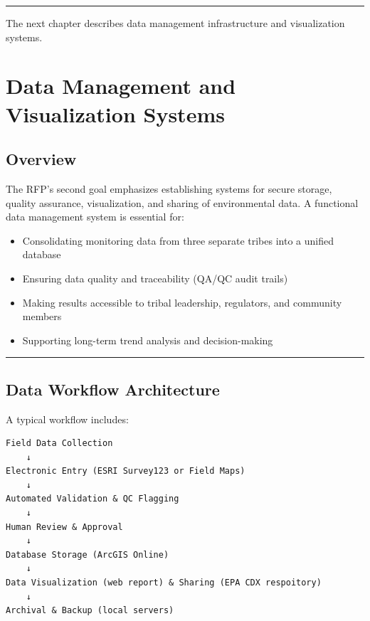 \documentclass[
  letterpaper,
]{scrbook}
\providecommand{\tightlist}{%
  \setlength{\itemsep}{0pt}\setlength{\parskip}{0pt}}\usepackage{longtable,booktabs,array}
\begin{document}
\begin{center}\rule{0.5\linewidth}{0.5pt}\end{center}

The next chapter describes data management infrastructure and
visualization systems.

\chapter{Data Management and Visualization
Systems}\label{data-management-and-visualization-systems}

\section{Overview}\label{overview-4}

The RFP's second goal emphasizes establishing systems for secure
storage, quality assurance, visualization, and sharing of environmental
data. A functional data management system is essential for:

\begin{itemize}
\tightlist
\item
  Consolidating monitoring data from three separate tribes into a
  unified database
\item
  Ensuring data quality and traceability (QA/QC audit trails)
\item
  Making results accessible to tribal leadership, regulators, and
  community members
\item
  Supporting long-term trend analysis and decision-making
\end{itemize}

\begin{center}\rule{0.5\linewidth}{0.5pt}\end{center}

\section{Data Workflow Architecture}\label{data-workflow-architecture}

A typical workflow includes:

\begin{verbatim}
Field Data Collection
    ↓
Electronic Entry (ESRI Survey123 or Field Maps)
    ↓
Automated Validation & QC Flagging
    ↓
Human Review & Approval
    ↓
Database Storage (ArcGIS Online)
    ↓
Data Visualization (web report) & Sharing (EPA CDX respoitory)
    ↓
Archival & Backup (local servers)
\end{verbatim}
\end{document}
